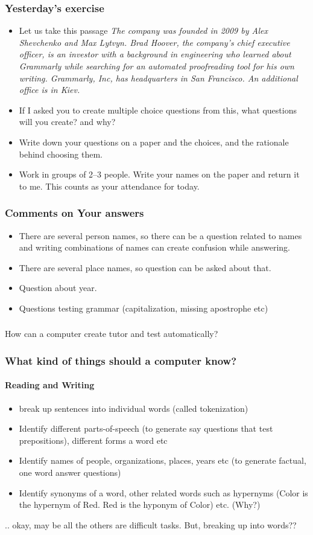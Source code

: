 \documentclass{beamer}
\begin{document}
\begin{frame}
\frametitle{Yesterday's exercise}
\begin{itemize}
\item Let us take this passage \small{\textit{The company was founded in 2009 by Alex Shevchenko and Max Lytvyn. Brad Hoover, the company's chief executive officer, is an investor with a background in engineering who learned about Grammarly while searching for an automated proofreading tool for his own writing. Grammarly, Inc, has headquarters in San Francisco. An additional office is in Kiev.}}
\normalsize \item If I asked you to create multiple choice questions from this, what questions will you create? and why? 
\item Write down your questions on a paper and the choices, and the rationale behind choosing them.
\item Work in groups of 2--3 people. Write your names on the paper and return it to me. This counts as your attendance for today. 
\end{itemize}
\end{frame}

\begin{frame}
\frametitle{Comments on Your answers}
\begin{itemize}
\item There are several person names, so there can be a question related to names and writing combinations of names can create confusion while answering.
\item There are several place names, so question can be asked about that.
\item Question about year.
\item Questions testing grammar (capitalization, missing apostrophe etc)
\end{itemize}
\end{frame}

\begin{frame}
\frametitle{}
\begin{center}
\Large How can a computer create tutor and test automatically?
\end{center}
\end{frame}

\begin{frame}
\frametitle{What kind of things should a computer know?}
\framesubtitle{Reading and Writing}
\begin{itemize}
\item break up sentences into individual words (called tokenization)
\item Identify different parts-of-speech (to generate say questions that test prepositions), different forms a word etc
\item Identify names of people, organizations, places, years etc (to generate factual, one word answer questions)
\item Identify synonyms of a word, other related words such as hypernyms (Color is the hypernym of Red. Red is the hyponym of Color) etc. (Why?) 
\end{itemize} \pause
.. okay, may be all the others are difficult tasks. But, breaking up into words??
\end{frame}
\end{document}
